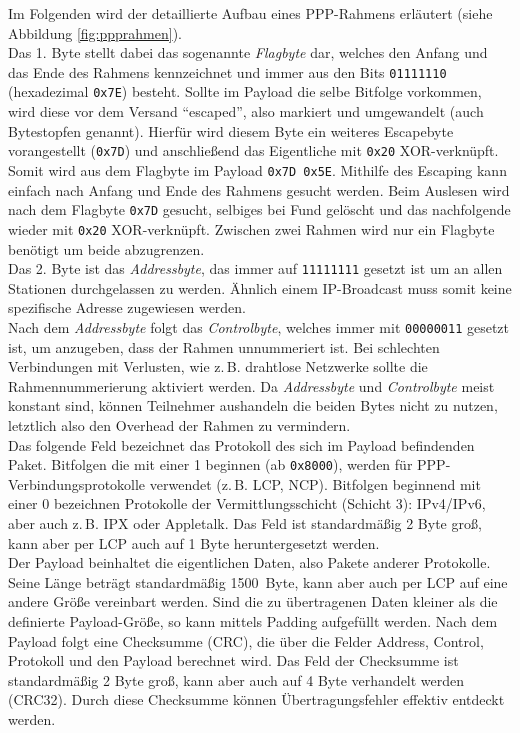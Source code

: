 \documentclass[journal,11pt]{IEEEtran}
\begin{document}
Im Folgenden wird der detaillierte Aufbau eines PPP-Rahmens erläutert (siehe Abbildung \ref{fig:ppprahmen}).\\
Das 1. Byte stellt dabei das sogenannte \textit{Flagbyte} dar, welches den Anfang und das Ende des Rahmens kennzeichnet und immer aus den Bits \texttt{01111110} (hexadezimal \texttt{0x7E}) besteht. Sollte im Payload die selbe Bitfolge vorkommen, wird diese vor dem Versand ``escaped'', also markiert und umgewandelt (auch Bytestopfen genannt). Hierfür wird diesem Byte ein weiteres Escapebyte vorangestellt (\texttt{0x7D}) und anschließend das Eigentliche mit \texttt{0x20} XOR-verknüpft. Somit wird aus dem Flagbyte im Payload \texttt{0x7D 0x5E}. Mithilfe des Escaping kann einfach nach Anfang und Ende des Rahmens gesucht werden. Beim Auslesen wird nach dem Flagbyte \texttt{0x7D} gesucht, selbiges bei Fund gelöscht und das nachfolgende wieder mit \texttt{0x20} XOR-verknüpft. Zwischen zwei Rahmen wird nur ein Flagbyte benötigt um beide abzugrenzen.\\
Das 2. Byte ist das \textit{Addressbyte}, das immer auf \texttt{11111111} gesetzt ist um an allen Stationen durchgelassen zu werden. Ähnlich einem IP-Broadcast muss somit keine spezifische Adresse zugewiesen werden.\\
Nach dem \textit{Addressbyte} folgt das \textit{Controlbyte}, welches immer mit \texttt{00000011} gesetzt ist, um anzugeben, dass der Rahmen unnummeriert ist. Bei schlechten Verbindungen mit Verlusten, wie z.\,B. drahtlose Netzwerke sollte die Rahmennummerierung aktiviert werden. Da \textit{Addressbyte} und \textit{Controlbyte} meist konstant sind, können Teilnehmer aushandeln die beiden Bytes nicht zu nutzen, letztlich also den Overhead der Rahmen zu vermindern.\\
Das folgende Feld bezeichnet das Protokoll des sich im Payload befindenden Paket. Bitfolgen die mit einer 1 beginnen (ab \texttt{0x8000}), werden für PPP-Verbindungsprotokolle verwendet (z.\,B. LCP, NCP). Bitfolgen beginnend mit einer 0 bezeichnen Protokolle der Vermittlungsschicht (Schicht 3): IPv4/IPv6, aber auch z.\,B. IPX oder Appletalk. Das Feld ist standardmäßig 2 Byte groß, kann aber per LCP auch auf 1 Byte heruntergesetzt werden.\\
Der Payload beinhaltet die eigentlichen Daten, also Pakete anderer Protokolle. Seine Länge beträgt standardmäßig 1500~Byte, kann aber auch per LCP auf eine andere Größe vereinbart werden. Sind die zu übertragenen Daten kleiner als die definierte Payload-Größe, so kann mittels Padding aufgefüllt werden.
Nach dem Payload folgt eine Checksumme (CRC), die über die Felder Address, Control, Protokoll und den Payload berechnet wird. Das Feld der Checksumme ist standardmäßig 2 Byte groß, kann aber auch auf 4 Byte verhandelt werden (CRC32). Durch diese Checksumme können Übertragungsfehler effektiv entdeckt werden.
\end{document}
